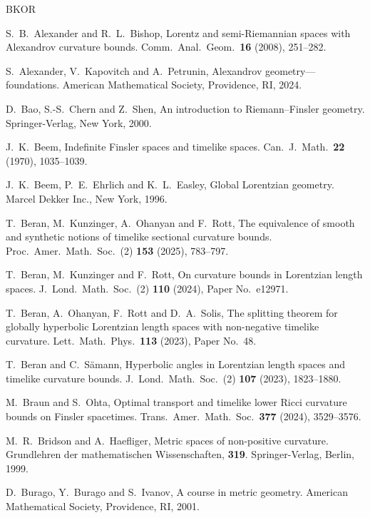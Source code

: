 \documentclass[a4paper,11pt]{article}
\numberwithin{equation}{section}
\theoremstyle{definition}
\theoremstyle{plain}
\begin{document}
\begin{thebibliography}{BKOR}%


S.~B.~Alexander and R.~L.~Bishop,
Lorentz and semi-Riemannian spaces with Alexandrov curvature bounds.
Comm.\ Anal.\ Geom.\ \textbf{16} (2008), 251--282.

S.~Alexander, V.~Kapovitch and A.~Petrunin,
Alexandrov geometry---foundations.
American Mathematical Society, Providence, RI, 2024.

D.~Bao, S.-S.~Chern and Z.~Shen, An introduction to Riemann--Finsler geometry.
Springer-Verlag, New York, 2000.

J.~K.~Beem, Indefinite Finsler spaces and timelike spaces.
Can.\ J.\ Math.\ \textbf{22} (1970), 1035--1039.

J.~K.~Beem, P.~E.~Ehrlich and K.~L.~Easley,
Global Lorentzian geometry.
Marcel Dekker Inc., New York, 1996.

T.~Beran, M.~Kunzinger, A.~Ohanyan and F.~Rott,
The equivalence of smooth and synthetic notions of timelike sectional curvature bounds.
Proc.\ Amer.\ Math.\ Soc.\ (2) \textbf{153} (2025), 783--797. 

T.~Beran, M.~Kunzinger and F.~Rott,
On curvature bounds in Lorentzian length spaces.
J.\ Lond.\ Math.\ Soc.\ (2) \textbf{110} (2024), Paper No.~e12971.

T.~Beran, A.~Ohanyan, F.~Rott and D.~A.~Solis,
The splitting theorem for globally hyperbolic Lorentzian length spaces with non-negative timelike curvature.
Lett.\ Math.\ Phys.\ \textbf{113} (2023), Paper No.~48.

T.~Beran and C.~S\"amann,
Hyperbolic angles in Lorentzian length spaces and timelike curvature bounds.
J.\ Lond.\ Math.\ Soc.\ (2) \textbf{107} (2023), 1823--1880.

M.~Braun and S.~Ohta,
Optimal transport and timelike lower Ricci curvature bounds on Finsler spacetimes.
Trans.\ Amer.\ Math.\ Soc.\ \textbf{377} (2024), 3529--3576.

M.~R.~Bridson and A.~Haefliger,
Metric spaces of non-positive curvature.
Grundlehren der mathematischen Wissenschaften, \textbf{319}.
Springer-Verlag, Berlin, 1999.

D.~Burago, Y.~Burago and S.~Ivanov,
A course in metric geometry.
American Mathematical Society, Providence, RI, 2001.


\end{thebibliography}
\end{document}
